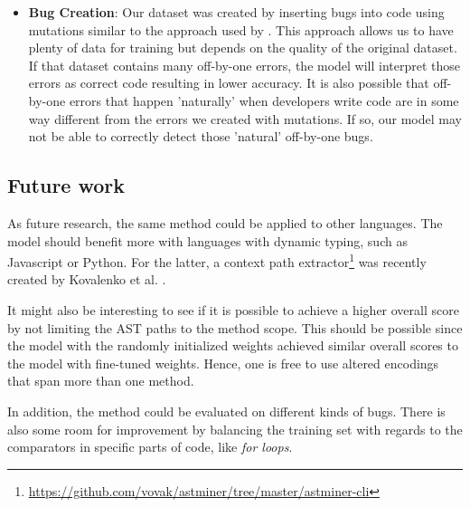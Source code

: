 \begin{itemize}
    \item {\textbf{Bug Creation}: Our dataset was created by inserting bugs into code using mutations similar to the approach used by \cite{pradel2018deepbugs}. This approach allows us to have plenty of data for training but depends on the quality of the original dataset. If that dataset contains many off-by-one errors, the model will interpret those errors as correct code resulting in lower accuracy. It is also possible that off-by-one errors that happen 'naturally' when developers write code are in some way different from the errors we created with mutations. If so, our model may not be able to correctly detect those 'natural' off-by-one bugs.}
    
\end{itemize}{}

\subsection{Future work} \label{sec:future_work}
As future research, the same method could be applied to other languages. The model should benefit more with languages with dynamic typing, such as Javascript or Python. For the latter, a context path extractor\footnote{\url{https://github.com/vovak/astminer/tree/master/astminer-cli}} was recently created by Kovalenko et al. \cite{kovalenko2019pathminer}.

It might also be interesting to see if it is possible to achieve a
higher overall score by not limiting the AST paths to the method scope. This should be possible since the model with
the randomly initialized weights achieved similar overall scores to
the model with fine-tuned weights. Hence, one is free to use altered encodings that span more than one method.

In addition, the method could be evaluated on different kinds of bugs. There is also some room for improvement by balancing the training set with regards to the comparators in specific parts of code, like \textit{for loops}.